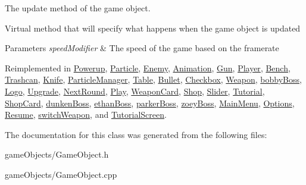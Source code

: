 The update method of the game object. 

Virtual method that will specify what happens when the game object is updated 
\begin{DoxyParams}{Parameters}
{\em speed\+Modifier} & The speed of the game based on the framerate \\
\hline
\end{DoxyParams}


Reimplemented in \hyperlink{class_powerup_a9e2f40a979bbc15787a607871b6644ce}{Powerup}, \hyperlink{class_particle_a9bd18a091946b1814f685118dfe66a1e}{Particle}, \hyperlink{class_enemy_a5509b06f70a649c4ea9d1fb06f07cb5c}{Enemy}, \hyperlink{class_animation_ae17ebf5f4b47801e460eb63342d858e8}{Animation}, \hyperlink{class_gun_ae7cbc34b103c1e89b4536309582dafb5}{Gun}, \hyperlink{class_player_a70e7b6ef62c5b8080e454edcb15cacc8}{Player}, \hyperlink{class_bench_abb815aa9afeee6e72fa93db3d51cf1a1}{Bench}, \hyperlink{class_trashcan_a6d44d844ec5c4155158b4e4d5fc222a4}{Trashcan}, \hyperlink{class_knife_ac861c5829858e00f82cbfdddb4a7d0b4}{Knife}, \hyperlink{class_particle_manager_a2c786926fc1cd9992c518b3ea4ee07cb}{Particle\+Manager}, \hyperlink{class_table_af37e903447fa51718b7ad49dd2d4dbc3}{Table}, \hyperlink{class_bullet_acfcfcf7146d04ad78520292c55ca6eee}{Bullet}, \hyperlink{class_checkbox_af8103187e6df3f44b010a098d7473b55}{Checkbox}, \hyperlink{class_weapon_a098b1074ff1099e9fbd83d1186b8f18f}{Weapon}, \hyperlink{classbobby_boss_a1ba19c55017f2fb3f0b1679d82095d78}{bobby\+Boss}, \hyperlink{class_logo_a3c7f6eb9479e2594652d2a2f60c77e21}{Logo}, \hyperlink{class_upgrade_a66b04bde03bdf6ad0935b98963619444}{Upgrade}, \hyperlink{class_next_round_ab6c2cb6a601f19c9898f962973c765c2}{Next\+Round}, \hyperlink{class_play_ae8b65105669a71c09901aae7b7e6f764}{Play}, \hyperlink{class_weapon_card_a160dc14db9e74b67537e74fcbf0a6e75}{Weapon\+Card}, \hyperlink{class_shop_a80125375c97c1028281e9458885ac0f0}{Shop}, \hyperlink{class_slider_a762b3a7ca00a3a665a1aeceba2e54fac}{Slider}, \hyperlink{class_tutorial_aeaa7fe8ebcd65dc23ca2df5c73ba5a48}{Tutorial}, \hyperlink{class_shop_card_a3f71274bdfc6c739969439975a3f0711}{Shop\+Card}, \hyperlink{classdunken_boss_ad9ae91ab3ce0b97ee48ab90203c7e4fd}{dunken\+Boss}, \hyperlink{classethan_boss_a6e47b12c5e718ecee5d888bcde580c1a}{ethan\+Boss}, \hyperlink{classparker_boss_a5f82194f8880924981fccd4bf611f324}{parker\+Boss}, \hyperlink{classzoey_boss_aa712b8f9050e3851cb0133927acd3f54}{zoey\+Boss}, \hyperlink{class_main_menu_a41b86746c468d18532123dfda01425de}{Main\+Menu}, \hyperlink{class_options_aa331e18456d83724b67f94a0827118c4}{Options}, \hyperlink{class_resume_a79207ae2fa394f8a2d0754fef119854d}{Resume}, \hyperlink{classswitch_weapon_a63fe71ba783dce920b6180efb2258735}{switch\+Weapon}, and \hyperlink{class_tutorial_screen_a67f9d997c5702c3ee032d7070d6363ec}{Tutorial\+Screen}.



The documentation for this class was generated from the following files\+:\begin{DoxyCompactItemize}
\item 
game\+Objects/Game\+Object.\+h\item 
game\+Objects/Game\+Object.\+cpp\end{DoxyCompactItemize}
